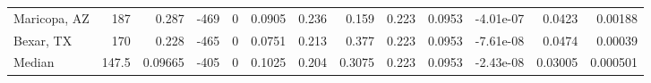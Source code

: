 \documentclass[12pt,letterpaper]{article}
\begin{document}
\begin{sidewaystable}
{\begin{tabular}{lrrrrrrrrrrrr}
 Maricopa, AZ       & 187   & 0.287   &  -469 &     0 &          0.0905 &            0.236 &         0.159  &        0.223 &       0.0953 &        -4.01e-07 &           0.0423  &        0.00188  \\
 Bexar, TX          & 170   & 0.228   &  -465 &     0 &          0.0751 &            0.213 &         0.377  &        0.223 &       0.0953 &        -7.61e-08 &           0.0474  &        0.00039  \\
\hline
 Median             & 147.5 & 0.09665 &  -405 &     0 &          0.1025 &            0.204 &         0.3075 &        0.223 &       0.0953 &        -2.43e-08 &           0.03005 &        0.000501 \\
\hline
\end{tabular}


}\end{sidewaystable}
\end{document}
